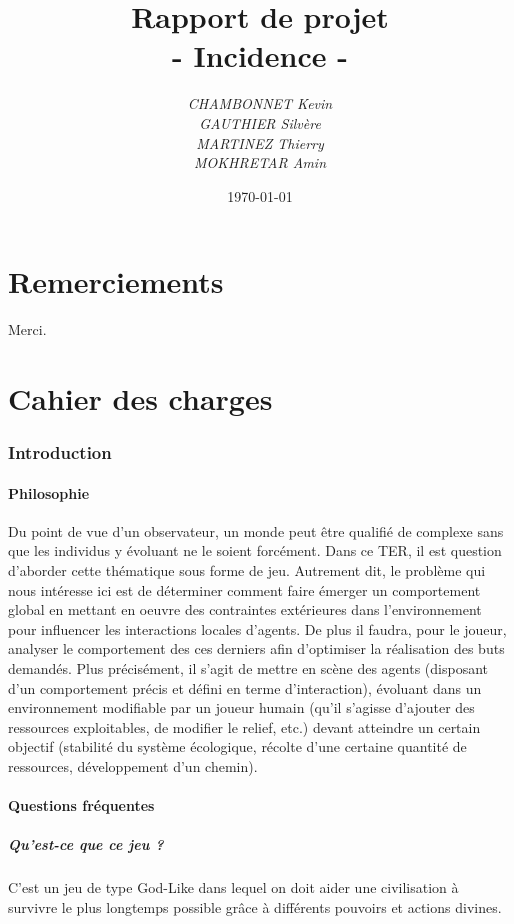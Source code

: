\documentclass[a4paper]{article}
\title{\textbf{Rapport de projet}\\- \Huge{Incidence} -}
\author{\emph{CHAMBONNET Kevin}\\\emph{GAUTHIER Silvère}\\\emph{MARTINEZ Thierry}\\\emph{MOKHRETAR Amin}}
\date{\today}
\newcommand{\alinea}{\hspace*{0.5cm}}
\begin{document}
  \maketitle
  \newpage
  \tableofcontents
  
  \newpage
  \part{Remerciements}
		Merci.
		
  \newpage
  \part{Cahier des charges}
  
    \section{Introduction}
      \subsection{Philosophie}
        \alinea Du point de vue d’un observateur, un monde peut être qualifié de complexe sans que les individus y évoluant ne le soient forcément. Dans ce TER, il est question d’aborder cette thématique sous forme de jeu. Autrement dit, le problème qui nous intéresse ici est de déterminer comment faire émerger un comportement global en mettant en oeuvre des contraintes extérieures dans l’environnement pour influencer les interactions locales d’agents. De plus il faudra, pour le joueur, analyser le comportement des ces derniers afin d’optimiser la réalisation des buts demandés. Plus précisément, il s’agit de mettre en scène des agents (disposant d’un comportement précis et défini en terme d’interaction), évoluant dans un environnement modifiable par un joueur humain (qu’il s’agisse d’ajouter des ressources exploitables, de modifier le relief, etc.) devant atteindre un certain objectif (stabilité du système écologique, récolte d’une certaine quantité de ressources, développement d’un chemin).

      \subsection{Questions fréquentes}
        \subsubsection{Qu'est-ce que ce jeu ?}
          \alinea C'est un jeu de type God-Like dans lequel on doit aider une civilisation à survivre le plus longtemps possible grâce à différents pouvoirs et actions divines.
			
\end{document}
